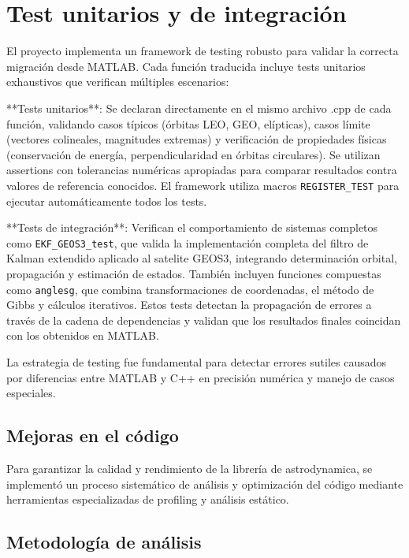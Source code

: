\documentclass[12pt,a4paper]{article}
\begin{document}
\section{Test unitarios y de integración}
% 
\begin{markdown}
El proyecto implementa un framework de testing robusto para validar la correcta migración desde MATLAB. Cada función traducida incluye tests unitarios exhaustivos que verifican múltiples escenarios:

**Tests unitarios**: Se declaran directamente en el mismo archivo .cpp de cada función, validando casos típicos (órbitas LEO, GEO, elípticas), casos límite (vectores colineales, magnitudes extremas) y verificación de propiedades físicas (conservación de energía, perpendicularidad en órbitas circulares). Se utilizan assertions con tolerancias numéricas apropiadas para comparar resultados contra valores de referencia conocidos. El framework utiliza macros \texttt{REGISTER\_TEST} para ejecutar automáticamente todos los tests.

**Tests de integración**: Verifican el comportamiento de sistemas completos como \texttt{EKF\_GEOS3\_test}, que valida la implementación completa del filtro de Kalman extendido aplicado al satelite GEOS3, integrando determinación orbital, propagación y estimación de estados. También incluyen funciones compuestas como \texttt{anglesg}, que combina transformaciones de coordenadas, el método de Gibbs y cálculos iterativos. Estos tests detectan la propagación de errores a través de la cadena de dependencias y validan que los resultados finales coincidan con los obtenidos en MATLAB.

La estrategia de testing fue fundamental para detectar errores sutiles causados por diferencias entre MATLAB y C++ en precisión numérica y manejo de casos especiales.
\begin{markdown}


\section{Mejoras en el código}

Para garantizar la calidad y rendimiento de la librería de astrodynamica, se implementó un proceso sistemático de análisis y optimización del código mediante herramientas especializadas de profiling y análisis estático.


\subsection{Metodología de análisis}


\end{markdown}
\end{markdown}
\end{document}
